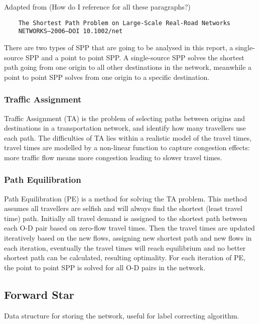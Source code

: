 {
    Adapted from (How do I reference for all these paragraphs?)
    \begin{verbatim}
    The Shortest Path Problem on Large-Scale Real-Road Networks
    NETWORKS—2006—DOI 10.1002/net
    \end{verbatim}
}
There are two types of SPP that are going to
be analysed in this report,
a single-source SPP and a point to point SPP.
A single-source SPP solves the shortest path going from one origin to all other destinations in the network,
meanwhile a point to point SPP solves from one origin to a specific destination.

\subsubsection{Traffic Assignment}
Traffic Assignment (TA) is the problem of selecting paths between origins and destinations in a transportation network,
and identify how many travellers use each path.
The difficulties of TA lies within a realistic model of the travel times,
travel times are modelled by a non-linear function to capture congestion effects:
more traffic flow means more congestion leading to slower travel times.

\subsubsection{Path Equilibration}
Path Equilibration (PE) is a method for solving the TA problem.
This method assumes all travellers are selfish and will always find the shortest (least travel time) path.
Initially all travel demand is assigned to the shortest path between each O-D pair based on zero-flow travel times.
Then the travel times are updated iteratively based on the new flows, 
assigning new shortest path and new flows in each iteration,
eventually the travel times will reach equilibrium and no better shortest path can be calculated,
resulting optimality.
For each iteration of PE,
the point to point SPP is solved for all O-D pairs in the network.


\subsection{Forward Star}\label{chap:forwardstar}
Data structure for storing the network,
useful for label correcting algorithm.

